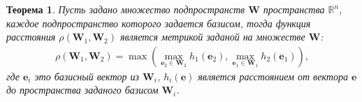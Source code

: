 \documentclass[12pt, twoside]{article}
\newtheorem{theorem}{Теорема}
\numberwithin{equation}{section}
\begin{document}
\begin{theorem} \label{th:1} 
Пусть задано множество подпространств $\mathbf{W}$ пространства $\mathbb{R}^{n}$, каждое подпространство которого задается базисом, тогда функция расстояния $\rho\left(\textbf{W}_1, \textbf{W}_2\right)$ является метрикой заданой на множестве $\mathbf{W}$:
\begin{equation}
\label{eq:th2:1}
\begin{aligned}
\rho\left(\textbf{W}_1, \textbf{W}_2\right) = \max\left(\max_{\textbf{e}_2 \in \textbf{W}_2} h_{1}\left(\textbf{e}_2\right), \max_{\textbf{e}_1 \in \textbf{W}_1} h_{2}\left(\textbf{e}_1\right)\right),
\end{aligned}
\end{equation}
где $\textbf{e}_i$ это базисный вектор из $\textbf{W}_i$, $h_i\left(\textbf{e}\right)$ является расстоянием от вектора $\textbf{e}$ до пространства заданого базисом $\textbf{W}_i$.
\end{theorem}
\end{document}
